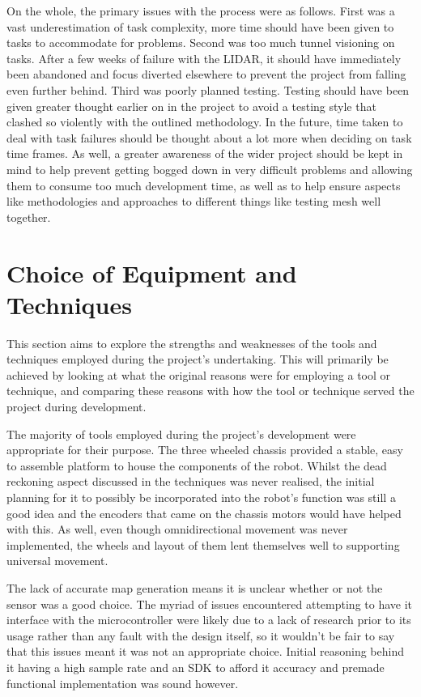 		On the whole, the primary issues with the process were as follows. First was a vast underestimation of task complexity, more time should have been given to tasks to accommodate for problems. Second was too much tunnel visioning on tasks. After a few weeks of failure with the LIDAR, it should have immediately been abandoned and focus diverted elsewhere to prevent the project from falling even further behind. Third was poorly planned testing. Testing should have been given greater thought earlier on in the project to avoid a testing style that clashed so violently with the outlined methodology. In the future, time taken to deal with task failures should be thought about a lot more when deciding on task time frames. As well, a greater awareness of the wider project should be kept in mind to help prevent getting bogged down in very difficult problems and allowing them to consume too much development time, as well as to help ensure aspects like methodologies and approaches to different things like testing mesh well together.
	
		\section{Choice of Equipment and Techniques}
		This section aims to explore the strengths and weaknesses of the tools and techniques employed during the project's undertaking. This will primarily be achieved by looking at what the original reasons were for employing a tool or technique, and comparing these reasons with how the tool or technique served the project during development.
		
		The majority of tools employed during the project's development were appropriate for their purpose. The three wheeled chassis provided a stable, easy to assemble platform to house the components of the robot. Whilst the dead reckoning aspect discussed in the techniques was never realised, the initial planning for it to possibly be incorporated into the robot's function was still a good idea and the encoders that came on the chassis motors would have helped with this. As well, even though omnidirectional movement was never implemented, the wheels and layout of them lent themselves well to supporting universal movement.
		
		The lack of accurate map generation means it is unclear whether or not the sensor was a good choice. The myriad of issues encountered attempting to have it interface with the microcontroller were likely due to a lack of research prior to its usage rather than any fault with the design itself, so it wouldn't be fair to say that this issues meant it was not an appropriate choice. Initial reasoning behind it having a high sample rate and an SDK to afford it accuracy and premade functional implementation was sound however.
		
